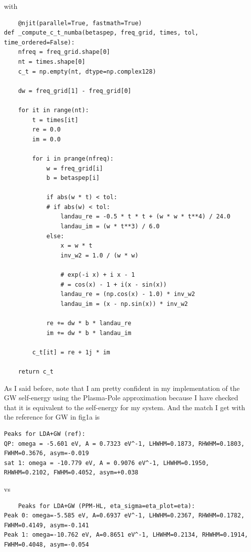 with 
\begin{verbatim}
    @njit(parallel=True, fastmath=True)
def _compute_c_t_numba(betaspep, freq_grid, times, tol, time_ordered=False):
    nfreq = freq_grid.shape[0]
    nt = times.shape[0]
    c_t = np.empty(nt, dtype=np.complex128)

    dw = freq_grid[1] - freq_grid[0]

    for it in range(nt):
        t = times[it]
        re = 0.0
        im = 0.0

        for i in prange(nfreq):
            w = freq_grid[i]
            b = betaspep[i]

            if abs(w * t) < tol:
            # if abs(w) < tol:
                landau_re = -0.5 * t * t + (w * w * t**4) / 24.0
                landau_im = (w * t**3) / 6.0
            else:
                x = w * t
                inv_w2 = 1.0 / (w * w)

                # exp(-i x) + i x - 1
                # = cos(x) - 1 + i(x - sin(x))
                landau_re = (np.cos(x) - 1.0) * inv_w2
                landau_im = (x - np.sin(x)) * inv_w2

            re += dw * b * landau_re
            im += dw * b * landau_im

        c_t[it] = re + 1j * im

    return c_t
\end{verbatim}
As I said before, note that I am pretty confident in my implementation of the GW self-energy using the Plasma-Pole approximation because I have checked that it is equivalent to the self-energy for my system. And the match I get with the reference for GW in fig1a is
\begin{verbatim}
Peaks for LDA+GW (ref):
QP: omega = -5.601 eV, A = 0.7323 eV^-1, LHWHM=0.1873, RHWHM=0.1803, FWHM=0.3676, asym=-0.019
sat 1: omega = -10.779 eV, A = 0.9076 eV^-1, LHWHM=0.1950, RHWHM=0.2102, FWHM=0.4052, asym=+0.038
\end{verbatim}
vs
\begin{verbatim}
    Peaks for LDA+GW (PPM-HL, eta_sigma=eta_plot=eta):
Peak 0: omega=-5.585 eV, A=0.6937 eV^-1, LHWHM=0.2367, RHWHM=0.1782, FWHM=0.4149, asym=-0.141
Peak 1: omega=-10.762 eV, A=0.8651 eV^-1, LHWHM=0.2134, RHWHM=0.1914, FWHM=0.4048, asym=-0.054
\end{verbatim}

